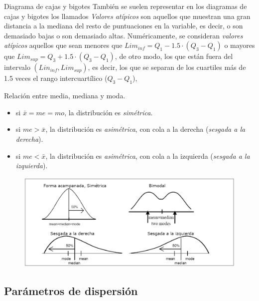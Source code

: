 \begin{myalertblock}{Diagrama de cajas y bigotes}
	\vspace{2mm} También se suelen representar en los diagramas de cajas y bigotes los llamados \emph{Valores atípicos} son aquellos que muestran una gran distancia a la mediana del resto de puntuaciones en la variable, es decir, o son demasiado bajas o son demasiado altas.  Numéricamente, se consideran \emph{valores atípicos} aquellos que sean menores que $Lim_{inf}=Q_1-1.5\cdot (Q_3-Q_1)$ o mayores que $Lim_{sup}=Q_3+1.5\cdot (Q_3-Q_1)$, de otro modo, los que están fuera del intervalo $(Lin_{inf},Lim_{sup})$, es decir, los que se separan de los cuartiles más de 1.5 veces el rango intercuartílico ($Q_3-Q_1$), 
	
	\vspace{2mm} 
	
\end{myalertblock}

\vspace{5mm}%
\begin{myalertblock}{Relación entre media, mediana y moda.}

\begin{itemize}
\item si $\bar{x}=me=mo$, la distribución es \emph{simétrica}.
\item si $me>\bar{x}$, la distribución es \emph{asimétrica}, con cola a la derecha (\emph{sesgada a la derecha}).
\item si $me<\bar{x}$, la distribución es \emph{asimétrica}, con cola a la izquierda (\emph{sesgada a la izquierda}).
\end{itemize}

	 \begin{figure}[H]
			\centering
			\includegraphics[width=1\textwidth]{imagenes/imagenes01/T01IM17.png}
	\end{figure}
	
\end{myalertblock}


\subsection{Parámetros de dispersión}
	
